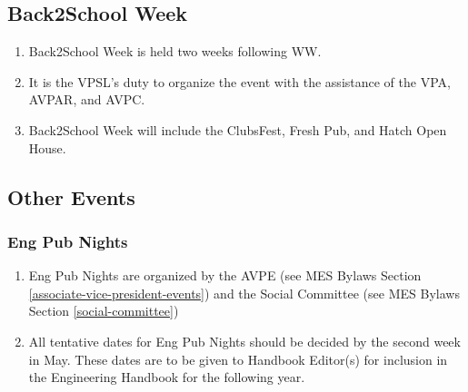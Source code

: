 \subsection{Back2School Week}
\label{back2school-week}
\begin{enumerate}
 \item
  Back2School Week is held two weeks following WW.
 \item
  It is the VPSL's duty to organize the event with the assistance of the VPA, AVPAR, and AVPC.
 \item
  Back2School Week will include the ClubsFest, Fresh Pub, and Hatch Open House.
\end{enumerate}

\subsection{Other Events}
\label{other-events}

\subsubsection{Eng Pub Nights}
\label{eng-pub-nights}
\begin{enumerate}
 \item
  Eng Pub Nights are organized by the AVPE (see MES Bylaws Section \ref{associate-vice-president-events}) and the Social Committee (see MES Bylaws Section \ref{social-committee})
 \item
  All tentative dates for Eng Pub Nights should be decided by the second week in May. These dates are to be given to Handbook Editor(s) for inclusion in the Engineering Handbook for the following year.
\end{enumerate}
